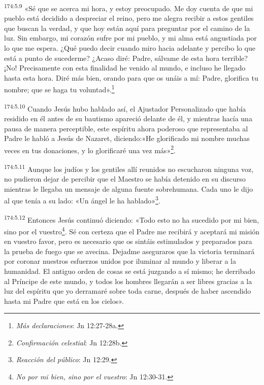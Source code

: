 \par 
\textsuperscript{174:5.9} «Sé que se acerca mi hora, y estoy preocupado. Me doy cuenta de que mi pueblo está decidido a despreciar el reino, pero me alegra recibir a estos gentiles que buscan la verdad, y que hoy están aquí para preguntar por el camino de la luz. Sin embargo, mi corazón sufre por mi pueblo, y mi alma está angustiada por lo que me espera. ¿Qué puedo decir cuando miro hacia adelante y percibo lo que está a punto de sucederme? ¿Acaso diré: Padre, sálvame de esta hora terrible? ¡No! Precisamente con esta finalidad he venido al mundo, e incluso he llegado hasta esta hora. Diré más bien, orando para que os unáis a mí: Padre, glorifica tu nombre; que se haga tu voluntad».\footnote{\textit{Más declaraciones}: Jn 12:27-28a.}

\par 
\textsuperscript{174:5.10} Cuando Jesús hubo hablado así, el Ajustador Personalizado que había residido en él antes de su bautismo apareció delante de él, y mientras hacía una pausa de manera perceptible, este espíritu ahora poderoso que representaba al Padre le habló a Jesús de Nazaret, diciendo:«He glorificado mi nombre muchas veces en tus donaciones, y lo glorificaré una vez más»\footnote{\textit{Confirmación celestial}: Jn 12:28b.}.

\par 
\textsuperscript{174:5.11} Aunque los judíos y los gentiles allí reunidos no escucharon ninguna voz, no pudieron dejar de percibir que el Maestro se había detenido en su discurso mientras le llegaba un mensaje de alguna fuente sobrehumana. Cada uno le dijo al que tenía a su lado: «Un ángel le ha hablado»\footnote{\textit{Reacción del público}: Jn 12:29.}.

\par 
\textsuperscript{174:5.12} Entonces Jesús continuó diciendo: «Todo esto no ha sucedido por mi bien, sino por el vuestro\footnote{\textit{No por mi bien, sino por el vuestro}: Jn 12:30-31.}. Sé con certeza que el Padre me recibirá y aceptará mi misión en vuestro favor, pero es necesario que os sintáis estimulados y preparados para la prueba de fuego que se avecina. Dejadme aseguraros que la victoria terminará por coronar nuestros esfuerzos unidos por iluminar al mundo y liberar a la humanidad. El antiguo orden de cosas se está juzgando a sí mismo; he derribado al Príncipe de este mundo, y todos los hombres llegarán a ser libres gracias a la luz del espíritu que yo derramaré sobre toda carne, después de haber ascendido hasta mi Padre que está en los cielos».

